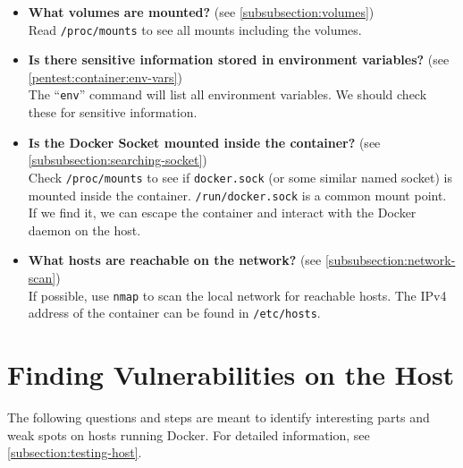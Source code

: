 \begin{itemize}
    \item \textbf{What volumes are mounted?} (see \autoref{subsubsection:volumes})\\
    Read \lstinline{/proc/mounts} to see all mounts including the volumes.

    \item \textbf{Is there sensitive information stored in environment variables?} (see \autoref{pentest:container:env-vars})\\
    The ``\lstinline{env}'' command will list all environment variables. We should check these for sensitive information.

    \item \textbf{Is the Docker Socket mounted inside the container?} (see \autoref{subsubsection:searching-socket})\\
        Check \lstinline{/proc/mounts} to see if \lstinline{docker.sock} (or some similar named socket) is mounted inside the container. \lstinline{/run/docker.sock} is a common mount point. If we find it, we can escape the container and interact with the Docker daemon on the host.

    \item \textbf{What hosts are reachable on the network?} (see \autoref{subsubsection:network-scan})\\
    If possible, use \lstinline{nmap} to scan the local network for reachable hosts. The IPv4 address of the container can be found in \lstinline{/etc/hosts}.
\end{itemize}

\section{Finding Vulnerabilities on the Host}\label{section:checklist-vulnerabilities-host}
The following questions and steps are meant to identify interesting parts and weak spots on hosts running Docker. For detailed information, see \autoref{subsection:testing-host}.

